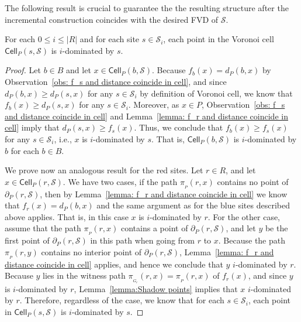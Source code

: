 \documentclass[a4paper,UKenglish]{socg-lipics-v2018}
\newcommand{\idom}[1][i]{${#1}$-dominated\xspace}
\newcommand{\s}{\mathcal S}
\newcommand{\dd}[3][P]{\ensuremath{d_{#1}(#2, #3)}}
\newcommand{\p}[3][P]{\ensuremath{\pi_{_{#1}}(#2, #3)}}
\newcommand{\cell}[2][P]{\ensuremath{\mathsf{Cell}_{\scriptscriptstyle #1}(#2)}}
\newcommand{\bcell}[2][P]{\ensuremath{\partial_{\scriptscriptstyle #1}(#2)}}
\begin{document}
The following result is crucial to guarantee the the resulting structure after the incremental construction coincides with the desired FVD of $\s$.

\begin{lemma}\label{lemma:Patch contains vcell} 
For each $0\leq i \leq |R|$ and for each site $s\in \s_i$, 
each point in the Voronoi cell $\cell{s, \s}$ is \idom by $s$.
\end{lemma}
\begin{proof}
Let $b\in B$ and let $x\in \cell{b, \s}$. 
Because $f_b(x) = \dd{b}{x}$ by Observation~\ref{obs: f_s and distance coincide in cell}, and since $\dd{b}{x} \geq \dd{s}{x}$ for any $s\in \s_i$ by definition of Voronoi cell, we know that $f_b(x) \geq \dd{s}{x}$ for any $s\in \s_i$. Moreover, as $x\in P$, Observation~\ref{obs: f_s and distance coincide in cell} and Lemma~\ref{lemma: f_r and distance coincide in cell} imply that $\dd{s}{x} \geq f_s(x)$. 
Thus, we conclude that $f_b(x) \geq f_s(x)$ for any $s\in \s_i$, i.e., $x$ is \idom by $s$. That is, $\cell{b, \s}$ is \idom by $b$ for each $b\in B$.

We prove now an analogous result for the red sites.
Let $r\in R$, and let $x\in \cell{r, \s}$.  We have two cases, if the path $\p{r}{x}$ contains no point of $\bcell{r, \s}$, then by Lemma~\ref{lemma: f_r and distance coincide in cell} we know that $f_r(x) = \dd{b}{x}$ and the same argument as for the blue sites described above applies. That is, in this case $x$ is \idom by $r$.
For the other case, assume that the path $\p{r}{x}$ contains a point of $\bcell{r, \s}$, and let $y$ be the first point of $\bcell{r, \s}$ in this path when going from $r$ to $x$.
Because the path $\p{r}{y}$ contains no interior point of $\bcell{r, \s}$, Lemma~\ref{lemma: f_r and distance coincide in cell} applies, and hence we conclude that $y$ \idom by $r$.
Because $y$ lies in the witness path $\p[G_r]{r}{x} = \p{r}{x}$ of $f_r(x)$, and since $y$ is \idom by $r$, Lemma~\ref{lemma:Shadow points} implies that $x$ \idom by $r$.
Therefore, regardless of the case, we know that for each $s\in \s_i$, each point in $\cell{s, \s}$ is \idom by $s$.
\end{proof}
\end{document}
